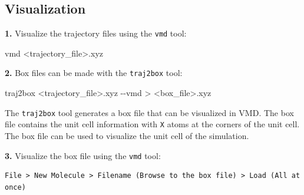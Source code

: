 \documentclass[
  letterpaper,
]{article}
\newenvironment{Shaded}{\begin{snugshade}}{\end{snugshade}}
\newcommand{\AttributeTok}[1]{\textcolor[rgb]{0.40,0.45,0.13}{#1}}
\newcommand{\ExtensionTok}[1]{\textcolor[rgb]{0.00,0.23,0.31}{#1}}
\newcommand{\NormalTok}[1]{\textcolor[rgb]{0.00,0.23,0.31}{#1}}
\newcommand{\OperatorTok}[1]{\textcolor[rgb]{0.37,0.37,0.37}{#1}}
\begin{document}
\hypertarget{visualization}{%
\subsection*{Visualization}\label{visualization}}


\textbf{1.} Visualize the trajectory files using the \texttt{vmd} tool:

\begin{Shaded}
\begin{Highlighting}[]
\ExtensionTok{vmd} \OperatorTok{\textless{}}\NormalTok{trajectory\_file}\OperatorTok{\textgreater{}}\NormalTok{.xyz}
\end{Highlighting}
\end{Shaded}

\textbf{2.} Box files can be made with the \texttt{traj2box} tool:

\begin{Shaded}
\begin{Highlighting}[]
\ExtensionTok{traj2box} \OperatorTok{\textless{}}\NormalTok{trajectory\_file}\OperatorTok{\textgreater{}}\NormalTok{.xyz }\AttributeTok{{-}{-}vmd} \OperatorTok{\textgreater{}} \OperatorTok{\textless{}}\NormalTok{box\_file}\OperatorTok{\textgreater{}}\NormalTok{.xyz}
\end{Highlighting}
\end{Shaded}

\begin{tcolorbox}[enhanced jigsaw, opacitybacktitle=0.6, colback=white, rightrule=.15mm, bottomrule=.15mm, coltitle=black, toprule=.15mm, bottomtitle=1mm, arc=.35mm, colframe=quarto-callout-note-color-frame, opacityback=0, toptitle=1mm, breakable, titlerule=0mm, left=2mm, title=\textcolor{quarto-callout-note-color}{\faInfo}\hspace{0.5em}{Note}, leftrule=.75mm, colbacktitle=quarto-callout-note-color!10!white]

The \texttt{traj2box} tool generates a box file that can be visualized
in VMD. The box file contains the unit cell information with \texttt{X}
atoms at the corners of the unit cell. The box file can be used to
visualize the unit cell of the simulation.

\end{tcolorbox}

\textbf{3.} Visualize the box file using the \texttt{vmd} tool:

\begin{verbatim}
File > New Molecule > Filename (Browse to the box file) > Load (All at once)
\end{verbatim}
\end{document}
